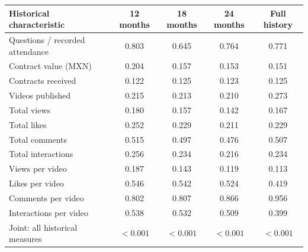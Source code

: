 \begingroup\small
\setlength{\tabcolsep}{3pt}
\renewcommand{\arraystretch}{1.25}
\noindent%
\begin{tabular*}{\linewidth}{@{\extracolsep{\fill}}lcccc@{}}
\toprule
Historical characteristic & 12 months & 18 months & 24 months & Full history \\
\midrule
Questions / recorded attendance & 0.803 & 0.645 & 0.764 & 0.771 \\
\addlinespace
Contract value (MXN) & 0.204 & 0.157 & 0.153 & 0.151 \\
Contracts received & 0.122 & 0.125 & 0.123 & 0.125 \\
\addlinespace
Videos published & 0.215 & 0.213 & 0.210 & 0.273 \\
Total views & 0.180 & 0.157 & 0.142 & 0.167 \\
Total likes & 0.252 & 0.229 & 0.211 & 0.229 \\
Total comments & 0.515 & 0.497 & 0.476 & 0.507 \\
Total interactions & 0.256 & 0.234 & 0.216 & 0.234 \\
Views per video & 0.187 & 0.143 & 0.119 & 0.113 \\
Likes per video & 0.546 & 0.542 & 0.524 & 0.419 \\
Comments per video & 0.802 & 0.807 & 0.866 & 0.956 \\
Interactions per video & 0.538 & 0.532 & 0.509 & 0.399 \\
\midrule
Joint: all historical measures & $<0.001$ & $<0.001$ & $<0.001$ & $<0.001$ \\
\bottomrule
\end{tabular*}\par\endgroup
